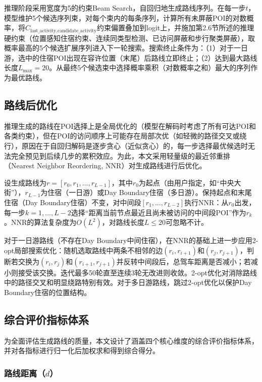 \documentclass[12pt,a4paper]{ctexart}
\begin{document}
推理阶段采用宽度为5的约束Beam Search，自回归地生成路线序列。在每一步$t$，模型维护5个候选序列束，对每个束内的每条序列，计算所有未屏蔽POI的对数概率，将$C_{\text{last\_activity},\text{candidate\_activity}}$约束偏置叠加到logit上，并施加第2.6节所述的推理硬约束（位置感知住宿约束、连续同类型检测、已访问屏蔽和步行聚类屏蔽），取概率最高的5个候选扩展序列进入下一轮搜索。搜索终止条件为：（1）对于一日游，选中的住宿POI出现在容许位置（末尾）后路线立即终止；（2）达到最大路线长度$L_{\max}=20$。从最终5个候选束中选择概率乘积（对数概率之和）最大的序列作为最优路线。

\subsection{路线后优化}

推理生成的路线在POI选择上是全局优化的（模型在解码时考虑了所有可达POI和各类约束），但在POI的访问顺序上可能存在局部次优（如轻微的路径交叉或绕行），原因在于自回归解码是逐步贪心（近似贪心）的，每一步选择最优候选时无法完全预见到后续几步的累积效应。为此，本文采用轻量级的最近邻重排（Nearest Neighbor Reordering, NNR）对生成路线进行后优化。

设生成路线为$r = [r_0, r_1, \dots, r_{L-1}]$，其中$r_0$为起点（由用户指定，如“中央大街”），$r_{L-1}$为住宿（一日游）或Day Boundary住宿（多日游）。保持起点和末尾住宿（Day Boundary住宿）不变，对中间段$[r_1, \dots, r_{L-2}]$执行NNR：从$r_0$出发，每一步$k=1,\dots,L-2$选择“距离当前节点最近且尚未被访问的中间段POI”作为$r_k$。NNR的算法复杂度为$O(L^2)$，对路线长度$L\leq 20$可忽略不计。

对于一日游路线（不存在Day Boundary中间住宿），在NNR的基础上进一步应用2-opt局部搜索优化：随机选取路线中两条不相邻的边$(r_i,r_{i+1})$和$(r_j,r_{j+1})$，判断若交换为$(r_i,r_j)$和$(r_{i+1},r_{j+1})$并反转中间段后，总驾车距离是否减小；若减小则接受该交换。迭代最多50轮直至连续3轮无改进则收敛。2-opt优化对消除路线中的路径交叉和明显绕路特别有效。对于多日游路线，跳过2-opt优化以保护Day Boundary住宿的位置结构。

\subsection{综合评价指标体系}

为全面评估生成路线的质量，本文设计了涵盖四个核心维度的综合评价指标体系，并对各指标进行归一化后加权求和得到综合得分。

\subsubsection{路线距离（$d$）}
\end{document}
